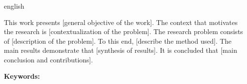
\begin{resumo}[Abstract]
  \begin{otherlanguage*}{english}

This work presents [general objective of the work]. The context
that motivates the research is [contextualization of the problem].
The research problem consists of [description of the problem].
To this end, [describe the method used]. The main results demonstrate
that [synthesis of results]. It is concluded that [main conclusion
and contributions].

\vspace{\onelineskip}

\noindent
\textbf{Keywords:} \keywords

  \end{otherlanguage*}
\end{resumo}
